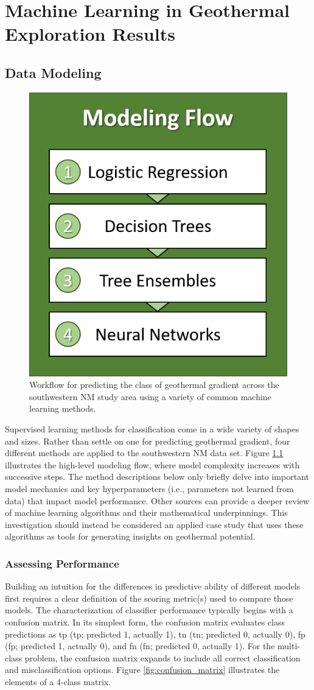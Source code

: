 \chapter{Machine Learning in Geothermal Exploration Results}\label{ch5:expl_ml}

\section{Data Modeling}

\begin{figure}
\centering
\includegraphics[width=.35\textwidth]{templates/images/Flow-Modeling.png}
\singlespacing
\caption[Modeling workflow]{Workflow for predicting the class of geothermal gradient across the southwestern NM study area using a variety of common machine learning methods.}
\label{fig:model_flow}
\end{figure}

Supervised learning methods for classification come in a wide variety of shapes and sizes. Rather than settle on one for predicting geothermal gradient, four different methods are applied to the southwestern NM data set. Figure \ref{fig:model_flow} illustrates the high-level modeling flow, where model complexity increases with successive steps. The method descriptions below only briefly delve into important model mechanics and key hyperparameters (i.e., parameters not learned from data) that impact model performance. Other sources can provide a deeper review of machine learning algorithms and their mathematical underpinnings. This investigation should instead be considered an applied case study that uses these algorithms as tools for generating insights on geothermal potential. 

\subsection{Assessing Performance}
Building an intuition for the differences in predictive ability of different models first requires a clear definition of the scoring metric(s) used to compare those models. The characterization of classifier performance typically begins with a confusion matrix. In its simplest form, the confusion matrix evaluates class predictions as \acrlong{tp} (\acrshort{tp}; predicted 1, actually 1), \acrlong{tn} (\acrshort{tn}; predicted 0, actually 0), \acrlong{fp} (\acrshort{fp}; predicted 1, actually 0), and \acrlong{fn} (\acrshort{fn}; predicted 0, actually 1). For the multi-class problem, the confusion matrix expands to include all correct classification and misclassification options. Figure \ref{fig:confusion_matrix} illustrates the elements of a 4-class matrix.

